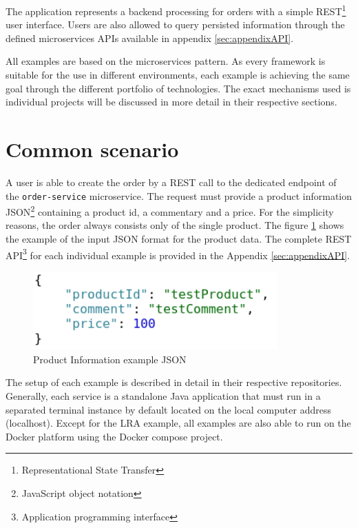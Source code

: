 \documentclass[oneside,
  digital, %
  table,   %
  nolof,     %
  nolot,     %
]{fithesis3}
\begin{document}
The application represents a backend processing for orders with a simple REST\footnote{Representational State Transfer} user interface. Users are also allowed to query persisted information through the defined microservices APIs available in appendix \ref{sec:appendixAPI}.

All examples are based on the microservices pattern. As every framework is suitable for the use in different environments, each example is achieving the same goal through the different portfolio of technologies. The exact mechanisms used is individual projects will be discussed in more detail in their respective sections.

\section{Common scenario}

A user is able to create the order by a REST call to the dedicated endpoint of the \texttt{order-service} microservice. The request must provide a product information JSON\footnote{JavaScript object notation} containing a product id, a commentary and a price. For the simplicity reasons, the order always consists only of the single product. The figure \ref{fig:inputJson} shows the example of the input JSON format for the product data. The complete REST API\footnote{Application programming interface} for each individual example is provided in the Appendix \ref{sec:appendixAPI}.

\begin{figure}
    \begin{center}
        \includegraphics[height=30mm]{images/productInfoJSON.png}
    \end{center}
    \caption{Product Information example JSON}
    \label{fig:inputJson}
\end{figure}

The setup of each example is described in detail in their respective repositories. Generally, each service is a standalone Java application that must run in a separated terminal instance by default located on the local computer address (localhost). Except for the LRA example, all examples are also able to run on the Docker\cite{docker} platform using the Docker compose project\cite{docker_compose}.
\end{document}
